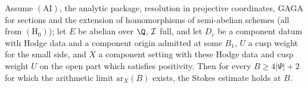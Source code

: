 \begin{proposition}\label{pf:volthm:prop:stokes}
Assume $(\mathrm{AI})$, the analytic package, resolution in projective coordinates, GAGA for sections and the extension
of homomorphisms of semi-abelian schemes (all from $(\mathrm{H}_0)$); let $E$ be abelian over $\Q$, $\mathcal{I}$ full, and
let $D_c$ be a component datum with Hodge data and a component origin admitted at some $B_1$, $U$ a cusp weight for the
small side, and $X$ a component setting with these Hodge data and cusp weight $U$ on the open part which satisfies
positivity. Then for every $B\ge4|\Psi|+2$ for which the arithmetic limit $\mathrm{ar}_X(B)$ exists, the Stokes
estimate holds at $B$.
\end{proposition}

